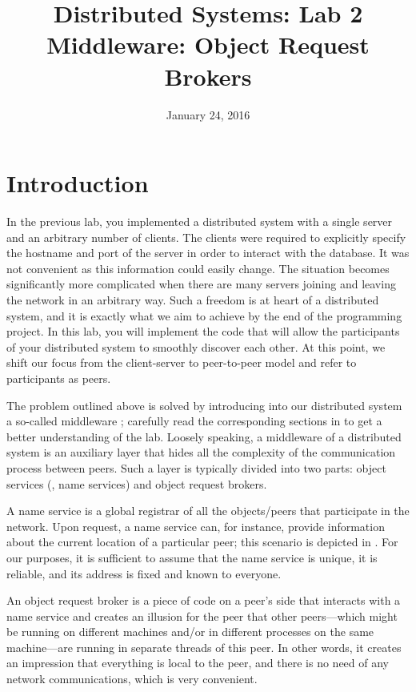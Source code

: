 \documentclass[a4paper]{article}
\title{Distributed Systems: Lab 2\\Middleware: Object Request Brokers}
\author{}
\date{January 24, 2016}
\begin{document}
\maketitle

\section{Introduction}

In the previous lab, you implemented a distributed system with a single server
and an arbitrary number of clients. The clients were required to explicitly
specify the hostname and port of the server in order to interact with the
database. It was not convenient as this information could easily change. The
situation becomes significantly more complicated when there are many servers
joining and leaving the network in an arbitrary way. Such a freedom is at heart
of a distributed system, and it is exactly what we aim to achieve by the end of
the programming project. In this lab, you will implement the code that will
allow the participants of your distributed system to smoothly discover each
other. At this point, we shift our focus from the client-server to peer-to-peer
model \cite{lecture3} and refer to participants as peers.

The problem outlined above is solved by introducing into our distributed system
a so-called middleware \cite{lecture4}; carefully read the corresponding
sections in \cite{lecture4} to get a better understanding of the lab. Loosely
speaking, a middleware of a distributed system is an auxiliary layer that hides
all the complexity of the communication process between peers. Such a layer is
typically divided into two parts: object services (\eg, name services) and
object request brokers.

A name service is a global registrar of all the objects/peers that participate
in the network. Upon request, a name service can, for instance, provide
information about the current location of a particular peer; this scenario is
depicted in . For our purposes, it is sufficient to assume
that the name service is unique, it is reliable, and its address is fixed and
known to everyone.

An object request broker \cite{lecture4, orb} is a piece of code on a peer's
side that interacts with a name service and creates an illusion for the peer
that other peers---which might be running on different machines and/or in
different processes on the same machine---are running in separate threads of
this peer. In other words, it creates an impression that everything is local to
the peer, and there is no need of any network communications, which is very
convenient.
\end{document}
